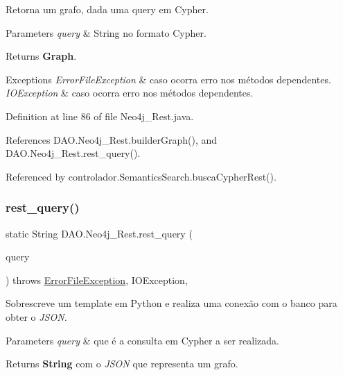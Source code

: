 Retorna um grafo, dada uma query em Cypher. 
\begin{DoxyParams}{Parameters}
{\em query} & String no formato Cypher. \\
\hline
\end{DoxyParams}
\begin{DoxyReturn}{Returns}
{\bfseries Graph}. 
\end{DoxyReturn}

\begin{DoxyExceptions}{Exceptions}
{\em Error\+File\+Exception} & caso ocorra erro nos métodos dependentes. \\
\hline
{\em I\+O\+Exception} & caso ocorra erro nos métodos dependentes. \\
\hline
\end{DoxyExceptions}


Definition at line 86 of file Neo4j\+\_\+\+Rest.\+java.



References D\+A\+O.\+Neo4j\+\_\+\+Rest.\+builder\+Graph(), and D\+A\+O.\+Neo4j\+\_\+\+Rest.\+rest\+\_\+query().



Referenced by controlador.\+Semantics\+Search.\+busca\+Cypher\+Rest().

\hypertarget{classDAO_1_1Neo4j__Rest_a6a3baef27da288379f39b90c7ca8b0a7}{}\label{classDAO_1_1Neo4j__Rest_a6a3baef27da288379f39b90c7ca8b0a7} 
\subsubsection{\texorpdfstring{rest\+\_\+query()}{rest\_query()}}
{\footnotesize\ttfamily static String D\+A\+O.\+Neo4j\+\_\+\+Rest.\+rest\+\_\+query (\begin{DoxyParamCaption}\item[{String}]{query }\end{DoxyParamCaption}) throws \hyperlink{classexcessao_1_1ErrorFileException}{Error\+File\+Exception}, 			I\+O\+Exception\hspace{0.3cm}{\ttfamily [static]}, {\ttfamily [private]}}

Sobrescreve um template em Python e realiza uma conexão com o banco para obter o {\itshape J\+S\+ON.} 
\begin{DoxyParams}{Parameters}
{\em query} & que é a consulta em Cypher a ser realizada. \\
\hline
\end{DoxyParams}
\begin{DoxyReturn}{Returns}
{\bfseries String} com o {\itshape J\+S\+ON} que representa um grafo. 
\end{DoxyReturn}

